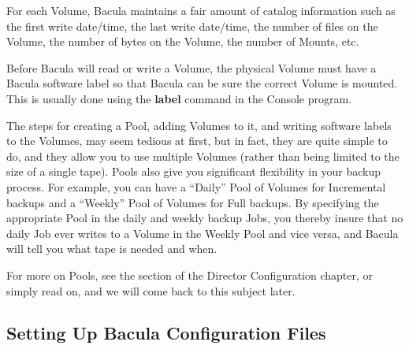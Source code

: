 For each Volume, Bacula maintains a fair amount of catalog information such as
the first write date/time, the last write date/time, the number of files on
the Volume, the number of bytes on the Volume, the number of Mounts, etc. 

Before Bacula will read or write a Volume, the physical Volume must have a
Bacula software label so that Bacula can be sure the correct Volume is
mounted. This is usually done using the {\bf label} command in the Console
program. 

The steps for creating a Pool, adding Volumes to it, and writing software
labels to the Volumes, may seem tedious at first, but in fact, they are quite
simple to do, and they allow you to use multiple Volumes (rather than being
limited to the size of a single tape). Pools also give you significant
flexibility in your backup process. For example, you can have a ``Daily'' Pool
of Volumes for Incremental backups and a ``Weekly'' Pool of Volumes for Full
backups. By specifying the appropriate Pool in the daily and weekly backup
Jobs, you thereby insure that no daily Job ever writes to a Volume in the
Weekly Pool and vice versa, and Bacula will tell you what tape is needed and
when. 

For more on Pools, see the 
 section of the Director
Configuration chapter, or simply read on, and we will come back to this
subject later. 

\subsection*{Setting Up Bacula Configuration Files}
\label{config}

